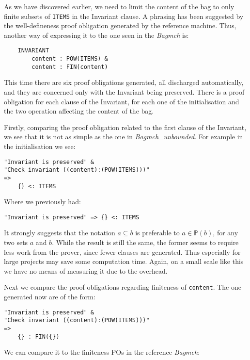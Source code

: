 \documentclass[11pt,journal]{IEEEtran}
\begin{document}
	As we have discovered earlier, we need to limit the content of the bag to only finite subsets of \texttt{ITEMS} in the Invariant clause. A phrasing has been suggested by the well-defineness proof obligation generated by the reference machine. Thus, another way of expressing it to the one seen in the \emph{Bagmch} is:
	
	\begin{lstlisting}
	INVARIANT
	    content : POW(ITEMS) & 
		content : FIN(content) 
	\end{lstlisting}
	
	This time there are six proof obligations generated, all discharged automatically, and they are concerned only with the Invariant being preserved. There is a proof obligation for each clause of the Invariant, for each one of the initialisation and the two operation affecting the content of the bag. 
	
	Firstly, comparing the proof obligation related to the first clause of the Invariant, we see that it is not as simple as the one in \emph{Bagmch\_unbounded}. For example in the initialisation we see:
	
	\begin{lstlisting}
"Invariant is preserved" &
"Check invariant ((content):(POW(ITEMS)))" 
=>
	{} <: ITEMS 
	\end{lstlisting}

	Where we previously had:
	\begin{lstlisting}
"Invariant is preserved" => {} <: ITEMS 
	\end{lstlisting}
	
	It strongly suggests that the notation $a \subseteq b$ is preferable to $a \in \mathbb{P}(b)$, for any two sets $a$ and $b$. While the result is still the same, the former seems to require less work from the prover, since fewer clauses are generated. Thus especially for large projects may save some computation time. Again, on a small scale like this we have no means of measuring it due to the overhead.
	
	Next we compare the proof obligations regarding finiteness of \texttt{content}. The one generated now are of the form:
	
	\begin{lstlisting}
"Invariant is preserved" &
"Check invariant ((content):(POW(ITEMS)))" 
=>
	{} : FIN({}) 
	\end{lstlisting}
	
	We can compare it to the finiteness POs in the reference \emph{Bagmch}:
	
\end{document}
